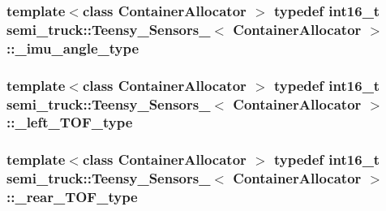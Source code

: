 \subsubsection[{\texorpdfstring{\+\_\+imu\+\_\+angle\+\_\+type}{_imu_angle_type}}]{\setlength{\rightskip}{0pt plus 5cm}template$<$class Container\+Allocator $>$ typedef int16\+\_\+t {\bf semi\+\_\+truck\+::\+Teensy\+\_\+\+Sensors\+\_\+}$<$ Container\+Allocator $>$\+::{\bf \+\_\+imu\+\_\+angle\+\_\+type}}\hypertarget{structsemi__truck_1_1_teensy___sensors___aaf882f7b6732e41e25877c88eb8a1c7a}{}\label{structsemi__truck_1_1_teensy___sensors___aaf882f7b6732e41e25877c88eb8a1c7a}
\subsubsection[{\texorpdfstring{\+\_\+left\+\_\+\+T\+O\+F\+\_\+type}{_left_TOF_type}}]{\setlength{\rightskip}{0pt plus 5cm}template$<$class Container\+Allocator $>$ typedef int16\+\_\+t {\bf semi\+\_\+truck\+::\+Teensy\+\_\+\+Sensors\+\_\+}$<$ Container\+Allocator $>$\+::{\bf \+\_\+left\+\_\+\+T\+O\+F\+\_\+type}}\hypertarget{structsemi__truck_1_1_teensy___sensors___ad6ac104c65141acb58bf4af051941136}{}\label{structsemi__truck_1_1_teensy___sensors___ad6ac104c65141acb58bf4af051941136}
\subsubsection[{\texorpdfstring{\+\_\+rear\+\_\+\+T\+O\+F\+\_\+type}{_rear_TOF_type}}]{\setlength{\rightskip}{0pt plus 5cm}template$<$class Container\+Allocator $>$ typedef int16\+\_\+t {\bf semi\+\_\+truck\+::\+Teensy\+\_\+\+Sensors\+\_\+}$<$ Container\+Allocator $>$\+::{\bf \+\_\+rear\+\_\+\+T\+O\+F\+\_\+type}}\hypertarget{structsemi__truck_1_1_teensy___sensors___ab8ba6b899ad8e9de101aa904e646d7e9}{}\label{structsemi__truck_1_1_teensy___sensors___ab8ba6b899ad8e9de101aa904e646d7e9}
